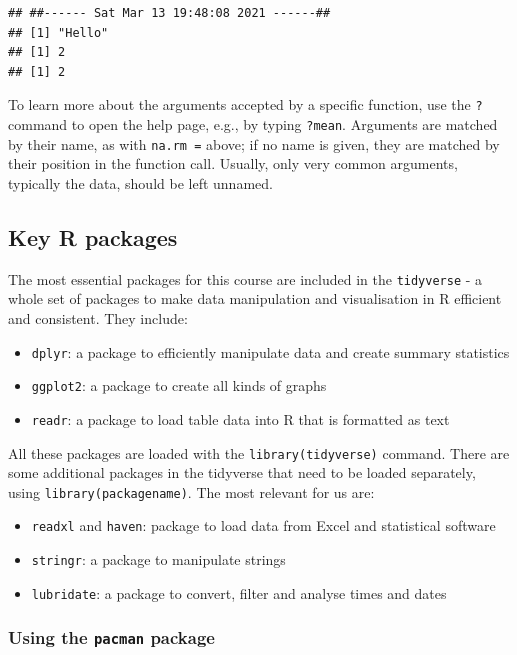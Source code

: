 \documentclass[
]{book}
\providecommand{\tightlist}{%
  \setlength{\itemsep}{0pt}\setlength{\parskip}{0pt}}
\begin{document}
\begin{verbatim}
## ##------ Sat Mar 13 19:48:08 2021 ------##
## [1] "Hello"
## [1] 2
## [1] 2
\end{verbatim}

To learn more about the arguments accepted by a specific function, use the \texttt{?} command to open the help page, e.g., by typing \texttt{?mean}. Arguments are matched by their name, as with \texttt{na.rm\ =} above; if no name is given, they are matched by their position in the function call. Usually, only very common arguments, typically the data, should be left unnamed.

\hypertarget{key-r-packages}{%
\subsection{Key R packages}\label{key-r-packages}}

The most essential packages for this course are included in the \texttt{tidyverse} - a whole set of packages to make data manipulation and visualisation in R efficient and consistent. They include:

\begin{itemize}
\tightlist
\item
  \texttt{dplyr}: a package to efficiently manipulate data and create summary statistics
\item
  \texttt{ggplot2}: a package to create all kinds of graphs
\item
  \texttt{readr}: a package to load table data into R that is formatted as text
\end{itemize}

All these packages are loaded with the \texttt{library(tidyverse)} command. There are some additional packages in the tidyverse that need to be loaded separately, using \texttt{library(packagename)}. The most relevant for us are:

\begin{itemize}
\tightlist
\item
  \texttt{readxl} and \texttt{haven}: package to load data from Excel and statistical software
\item
  \texttt{stringr}: a package to manipulate strings
\item
  \texttt{lubridate}: a package to convert, filter and analyse times and dates
\end{itemize}

\hypertarget{using-the-pacman-package}{%
\subsubsection{\texorpdfstring{Using the \texttt{pacman} package}{Using the pacman package}}\label{using-the-pacman-package}}
\end{document}
